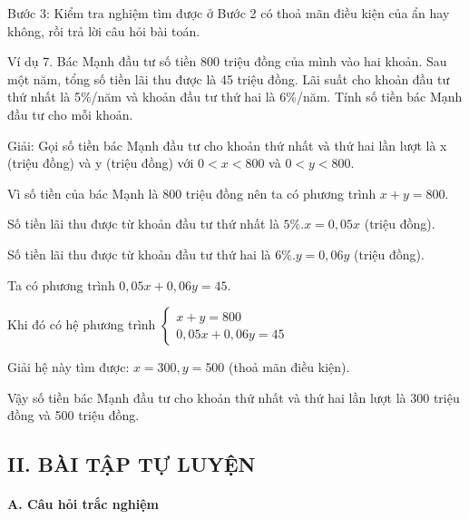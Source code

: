\documentclass[%
    fontsize=12pt,%
    chapterprefix=false,%
    open=right,%
    twoside=false,%
    numbers=noenddot,%
    headings=optiontohead,%
    final,%
    DIV=15,%
    parskip=half %
]{scrbook}
\begin{document}
Bước 3: Kiểm tra nghiệm tìm được ở Bước 2 có thoả mãn điều kiện của ẩn hay không, rồi trả lời câu hỏi bài toán.

Ví dụ 7. Bác Mạnh đầu tư số tiền 800 triệu đồng của mình vào hai khoản. Sau một năm, tổng số tiền lãi thu được là 45 triệu đồng. Lãi suất cho khoản đầu tư thứ nhất là 5\%/năm và khoản đầu tư thứ hai là 6\%/năm. Tính số tiền bác Mạnh đầu tư cho mỗi khoản.

Giải: Gọi số tiền bác Mạnh đầu tư cho khoản thứ nhất và thứ hai lần lượt là x (triệu đồng) và y (triệu đồng) với $ 0 < x < 800 $ và $ 0 < y < 800 $.

Vì số tiền của bác Mạnh là 800 triệu đồng nên ta có phương trình $ x + y = 800 $.

Số tiền lãi thu được từ khoản đầu tư thứ nhất là $ 5\% . x = 0,05x $ (triệu đồng).

Số tiền lãi thu được từ khoản đầu tư thứ hai là $ 6\% . y = 0,06y $ (triệu đồng).

Ta có phương trình $ 0,05x + 0,06y = 45 $.

Khi đó có hệ phương trình $ \begin{cases} x + y = 800 \\ 0,05x + 0,06y = 45 \end{cases} $

Giải hệ này tìm được: $ x = 300, y = 500 $ (thoả mãn điều kiện).

Vậy số tiền bác Mạnh đầu tư cho khoản thứ nhất và thứ hai lần lượt là 300 triệu đồng và 500 triệu đồng.
\subsection{II. BÀI TẬP TỰ LUYỆN}
\paragraph{A. Câu hỏi trắc nghiệm}
\end{document}

